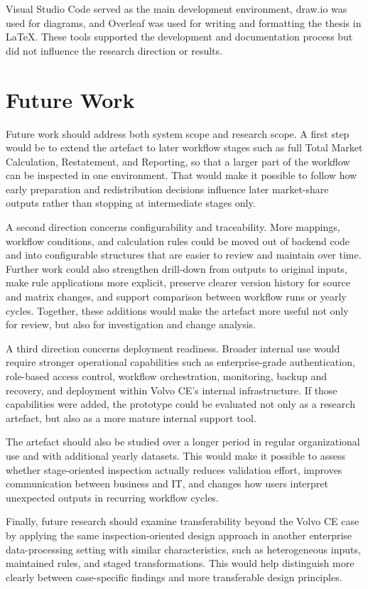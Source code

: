 Visual Studio Code served as the main development environment, draw.io was used for diagrams, and Overleaf was used for writing and formatting the thesis in \LaTeX. These tools supported the development and documentation process but did not influence the research direction or results.





\section{Future Work}

Future work should address both system scope and research scope. A first step would be to extend the artefact to later workflow stages such as full Total Market Calculation, Restatement, and Reporting, so that a larger part of the workflow can be inspected in one environment. That would make it possible to follow how early preparation and redistribution decisions influence later market-share outputs rather than stopping at intermediate stages only.

A second direction concerns configurability and traceability. More mappings, workflow conditions, and calculation rules could be moved out of backend code and into configurable structures that are easier to review and maintain over time. Further work could also strengthen drill-down from outputs to original inputs, make rule applications more explicit, preserve clearer version history for source and matrix changes, and support comparison between workflow runs or yearly cycles. Together, these additions would make the artefact more useful not only for review, but also for investigation and change analysis.

A third direction concerns deployment readiness. Broader internal use would require stronger operational capabilities such as enterprise-grade authentication, role-based access control, workflow orchestration, monitoring, backup and recovery, and deployment within Volvo CE's internal infrastructure. If those capabilities were added, the prototype could be evaluated not only as a research artefact, but also as a more mature internal support tool.

The artefact should also be studied over a longer period in regular organizational use and with additional yearly datasets. This would make it possible to assess whether stage-oriented inspection actually reduces validation effort, improves communication between business and IT, and changes how users interpret unexpected outputs in recurring workflow cycles.

Finally, future research should examine transferability beyond the Volvo CE case by applying the same inspection-oriented design approach in another enterprise data-processing setting with similar characteristics, such as heterogeneous inputs, maintained rules, and staged transformations. This would help distinguish more clearly between case-specific findings and more transferable design principles.




